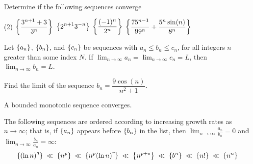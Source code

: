 \documentclass[../mathNotesPreamble]{subfiles}
\begin{document}
  \begin{ex*}
    Determine if the following sequences converge
  \end{ex*}
  \begin{tasks}[after-item-skip=\stretch{1}, label=, item-indent=0pt](2)
    \task $\displaystyle {\left\{\frac{3^{n+1}+3}{3^n}\right\}}$
    \task $\displaystyle {\left\{2^{n+1}3^{-n}\right\}}$
    \task $\displaystyle {\left\{\frac{(-1)^n}{2^n}\right\}}$
    \task $\displaystyle {\left\{\frac{75^{n-1}}{99^n}+\frac{5^n\sin(n)}{8^n}\right\}}$
  \end{tasks}
  \pagebreak

  \begin{thmBox*}
    Let ${\left\{a_n\right\}}$, ${\left\{b_n\right\}}$, and ${\left\{c_n\right\}}$ be sequences with $a_n\leq b_n\leq c_n$, for all integers $n$ greater than some index $N$. If $\displaystyle\lim_{n\to \infty} a_n=\lim_{n\to \infty} c_n=L$, then $\displaystyle\lim_{n\to \infty} b_n=L$.
  \end{thmBox*}
  \begin{ex*}
    Find the limit of the sequence $b_n=\dfrac{9\cos(n)}{n^2+1}$.
  \end{ex*}

  \begin{thmBox*}
    A bounded monotonic sequence converges.
  \end{thmBox*}
  \pagebreak

  \begin{thmBox*}
    The following sequences are ordered according to increasing growth rates as $n\to\infty$; that is, if ${\left\{a_n\right\}}$ appears before ${\left\{b_n\right\}}$ in the list, then $\displaystyle\lim_{n\to \infty} \frac{a_n}{b_n}=0$ and $\displaystyle\lim_{n\to \infty} \frac{b_n}{a_n}=\infty$:
      \[{\left\{{\left(\ln n\right)}^q\right\}} \hspace*{2.5pt} \ll \hspace*{2.5pt} {\left\{n^p\right\}} \hspace*{2.5pt} \ll \hspace*{2.5pt} {\left\{n^p{\left(\ln n\right)}^r\right\}} \hspace*{2.5pt} \ll \hspace*{2.5pt} {\left\{n^{p+s}\right\}} \hspace*{2.5pt} \ll \hspace*{2.5pt} {\left\{b^n\right\}} \hspace*{2.5pt} \ll \hspace*{2.5pt} {\left\{n!\right\}} \hspace*{2.5pt} \ll \hspace*{2.5pt} {\left\{n^n\right\}}\]
  \end{thmBox*}
\end{document}
